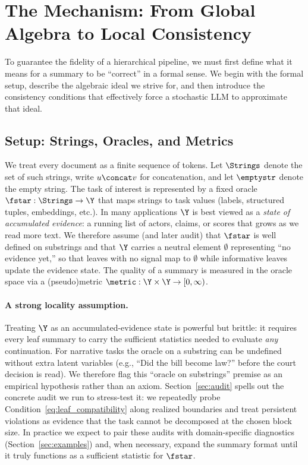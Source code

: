 \section{The Mechanism: From Global Algebra to Local Consistency}\label{sec:mechanism}\label{sec:setup}

To guarantee the fidelity of a hierarchical pipeline, we must first define what it means for a summary to be ``correct'' in a formal sense. We begin with the formal setup, describe the algebraic ideal we strive for, and then introduce the consistency conditions that effectively force a stochastic LLM to approximate that ideal.

\subsection{Setup: Strings, Oracles, and Metrics}

We treat every document as a finite sequence of tokens. Let $\Strings$ denote the set of such strings, write $u\concat v$ for concatenation, and let $\emptystr$ denote the empty string. The task of interest is represented by a fixed oracle $\fstar:\Strings\to\Y$ that maps strings to task values (labels, structured tuples, embeddings, etc.). In many applications $\Y$ is best viewed as a \emph{state of accumulated evidence}: a running list of actors, claims, or scores that grows as we read more text. We therefore assume (and later audit) that $\fstar$ is well defined on substrings and that $\Y$ carries a neutral element $\emptyset$ representing ``no evidence yet,'' so that leaves with no signal map to $\emptyset$ while informative leaves update the evidence state. The quality of a summary is measured in the oracle space via a (pseudo)metric $\metric:\Y\times\Y\to[0,\infty)$.

\paragraph{A strong locality assumption.}
Treating $\Y$ as an accumulated-evidence state is powerful but brittle: it requires every leaf summary to carry the sufficient statistics needed to evaluate \emph{any} continuation. For narrative tasks the oracle on a substring can be undefined without extra latent variables (e.g., ``Did the bill become law?'' before the court decision is read). We therefore flag this ``oracle on substrings'' premise as an empirical hypothesis rather than an axiom. Section~\ref{sec:audit} spells out the concrete audit we run to stress-test it: we repeatedly probe Condition~\eqref{eq:leaf_compatibility} along realized boundaries and treat persistent violations as evidence that the task cannot be decomposed at the chosen block size. In practice we expect to pair these audits with domain-specific diagnostics (Section~\ref{sec:examples}) and, when necessary, expand the summary format until it truly functions as a sufficient statistic for $\fstar$.

